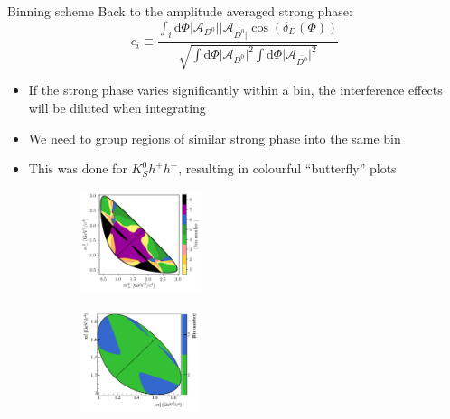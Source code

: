 \documentclass{beamer}
\begin{document}
\begin{frame}{Binning scheme}
  \vspace{0.0cm}
  {\large Back to the amplitude averaged strong phase:}
  \begin{equation*}
    c_i\equiv\frac{\int_i\mathrm{d}\Phi\lvert\mathcal{A}_{D^0}\lvert\lvert\mathcal{A}_{\bar{D^0}\lvert}\cos(\delta_D(\Phi))}{\sqrt{\int\mathrm{d}\Phi\lvert\mathcal{A}_{D^0}\lvert^2\int\mathrm{d}\Phi\lvert\mathcal{A}_{\bar{D^0}}\lvert^2}}
  \end{equation*}
  \begin{itemize}
    \setlength\itemsep{0.5em}
    \item{If the strong phase varies significantly within a bin, the interference effects will be diluted when integrating}
    \item{We need to group regions of similar strong phase into the same bin}
    \item{This was done for $K_S^0h^+h^-$, resulting in colourful ``butterfly'' plots}
  \end{itemize}
  \begin{figure}
    \centering
    \begin{subfigure}{0.45\textwidth}
      \centering
      \includegraphics[height = 3cm]{Plots/KsPiPi_optimal.png}
    \end{subfigure}%
    \begin{subfigure}{0.45\textwidth}
      \centering
      \includegraphics[height = 3cm]{Plots/KsKK_binning.png}
    \end{subfigure}
  \end{figure}
\end{frame}
\end{document}
